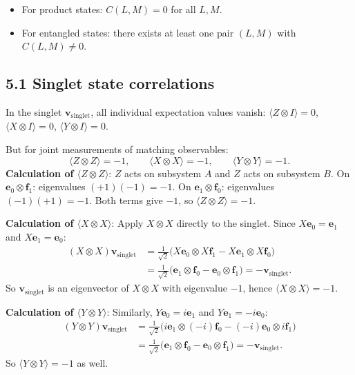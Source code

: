 \documentclass[12pt,a4paper]{article}
\begin{document}
\begin{itemize}[nosep]
    \item For product states: $C(L,M)=0$ for all $L,M$.
    \item For entangled states: there exists at least one pair $(L,M)$ with $C(L,M)\neq 0$.
\end{itemize}

\subsection{5.1 Singlet state correlations}
In the singlet $\mathbf{v}_{\text{singlet}}$, all individual expectation values vanish: $\langle Z \otimes I \rangle = 0$, $\langle X \otimes I \rangle = 0$, $\langle Y \otimes I \rangle = 0$.

But for joint measurements of matching observables:
\[
    \langle Z \otimes Z \rangle = -1, \qquad \langle X \otimes X \rangle = -1, \qquad \langle Y \otimes Y \rangle = -1.
\]
\textbf{Calculation of $\langle Z \otimes Z \rangle$}: $Z$ acts on subsystem $A$ and $Z$ acts on subsystem $B$.  On $\mathbf{e}_0\otimes\mathbf{f}_1$: eigenvalues $(+1)(-1)=-1$.  On $\mathbf{e}_1\otimes\mathbf{f}_0$: eigenvalues $(-1)(+1)=-1$.  Both terms give $-1$, so $\langle Z \otimes Z \rangle = -1$.

\textbf{Calculation of $\langle X \otimes X \rangle$}: Apply $X\otimes X$ directly to the singlet.  Since $X\mathbf{e}_0 = \mathbf{e}_1$ and $X\mathbf{e}_1 = \mathbf{e}_0$:
\begin{align*}
    (X\otimes X)\mathbf{v}_{\text{singlet}}
    &= \tfrac{1}{\sqrt{2}}\bigl(X\mathbf{e}_0\otimes X\mathbf{f}_1 - X\mathbf{e}_1\otimes X\mathbf{f}_0\bigr) \\
    &= \tfrac{1}{\sqrt{2}}\bigl(\mathbf{e}_1\otimes\mathbf{f}_0 - \mathbf{e}_0\otimes\mathbf{f}_1\bigr)
    = -\mathbf{v}_{\text{singlet}}.
\end{align*}
So $\mathbf{v}_{\text{singlet}}$ is an eigenvector of $X\otimes X$ with eigenvalue $-1$, hence $\langle X\otimes X\rangle = -1$.

\textbf{Calculation of $\langle Y \otimes Y \rangle$}: Similarly, $Y\mathbf{e}_0 = i\mathbf{e}_1$ and $Y\mathbf{e}_1 = -i\mathbf{e}_0$:
\begin{align*}
    (Y\otimes Y)\mathbf{v}_{\text{singlet}}
    &= \tfrac{1}{\sqrt{2}}\bigl(i\mathbf{e}_1\otimes(-i)\mathbf{f}_0 - (-i)\mathbf{e}_0\otimes i\mathbf{f}_1\bigr) \\
    &= \tfrac{1}{\sqrt{2}}\bigl(\mathbf{e}_1\otimes\mathbf{f}_0 - \mathbf{e}_0\otimes\mathbf{f}_1\bigr)
    = -\mathbf{v}_{\text{singlet}}.
\end{align*}
So $\langle Y\otimes Y\rangle = -1$ as well.
\end{document}
